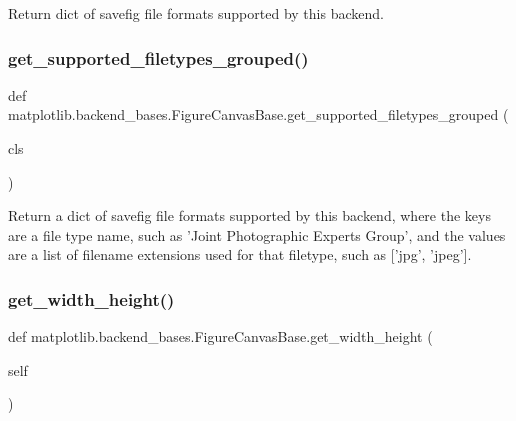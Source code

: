 \begin{DoxyVerb}Return dict of savefig file formats supported by this backend.\end{DoxyVerb}
 \mbox{\label{classmatplotlib_1_1backend__bases_1_1FigureCanvasBase_a30987b6730be81ad4858f80d32fcf74b}} 
\subsubsection{\texorpdfstring{get\+\_\+supported\+\_\+filetypes\+\_\+grouped()}{get\_supported\_filetypes\_grouped()}}
{\footnotesize\ttfamily def matplotlib.\+backend\+\_\+bases.\+Figure\+Canvas\+Base.\+get\+\_\+supported\+\_\+filetypes\+\_\+grouped (\begin{DoxyParamCaption}\item[{}]{cls }\end{DoxyParamCaption})}

\begin{DoxyVerb}Return a dict of savefig file formats supported by this backend,
where the keys are a file type name, such as 'Joint Photographic
Experts Group', and the values are a list of filename extensions used
for that filetype, such as ['jpg', 'jpeg'].
\end{DoxyVerb}
 \mbox{\label{classmatplotlib_1_1backend__bases_1_1FigureCanvasBase_a4db06231bf4e60e5192fe7675073c738}} 
\subsubsection{\texorpdfstring{get\+\_\+width\+\_\+height()}{get\_width\_height()}}
{\footnotesize\ttfamily def matplotlib.\+backend\+\_\+bases.\+Figure\+Canvas\+Base.\+get\+\_\+width\+\_\+height (\begin{DoxyParamCaption}\item[{}]{self }\end{DoxyParamCaption})}

